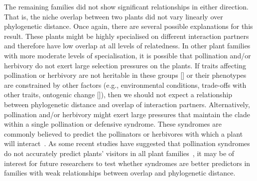 \documentclass[12pt]{article}
\begin{document}
\begin{spacing}{1.5}
  The remaining families did not show significant relationships 
  in either direction. That is, the niche overlap between two 
  plants did not vary linearly over phylogenetic distance. Once again, there 
  are several possible explanations for this result. These plants might 
  be highly specialised on different interaction partners and therefore
  have low overlap at all levels of relatedness. In other plant families
  with more moderate levels of specialisation, it is possible 
  that pollination and/or herbivory do not exert large
  selection pressures on the plants. If traits affecting pollination
  or herbivory are not heritable in these groups [\citealp{Kursar2009}] 
  or their phenotypes are constrained by other factors (e.g., 
  environmental conditions, trade-offs with other traits, ontogenic
  change [\citealp{Karinho2014}]), then we should not expect a relationship 
  between phylogenetic distance and overlap of interaction partners.
  Alternatively, pollination and/or herbivory might exert large 
  pressures that maintain the clade within a single pollination or 
  defensive syndrome. These syndromes are commonly believed to
  predict the pollinators or herbivores with which a plant will 
  interact~\citep{Waser1996,Fenster2004,Ollerton2009,Johnson2014}.
  As some recent studies have suggested that pollination syndromes
  do not accurately predict plants' visitors in all plant 
  families~\citep{Ollerton2009},
  it may be of interest for future researchers to test whether 
  syndromes are better predictors in families with weak 
  relationships between overlap and phylogenetic distance.



\end{spacing}
\end{document}
